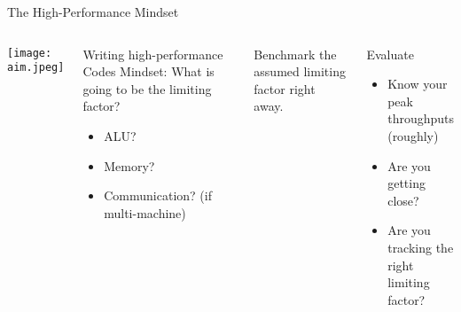\documentclass[english,compress]{beamer}
\begin{document}
\begin{frame}{The High-Performance Mindset}
  \begin{columns}
      \texttt{[image: aim.jpeg]}
      \begin{block}{Writing high-performance Codes}
        Mindset: What is going to be the limiting factor?

        \begin{itemize}
          \item ALU?
          \item Memory?
          \item Communication? (if multi-machine)
        \end{itemize}
      \end{block}

      Benchmark the assumed limiting factor right away.

      \begin{block}{Evaluate}
        \begin{itemize}
          \item Know your peak throughputs (roughly)
          \item Are you getting close?
          \item Are you tracking the right limiting factor?
        \end{itemize}
      \end{block}
  \end{columns}
\end{frame}

\end{document}
